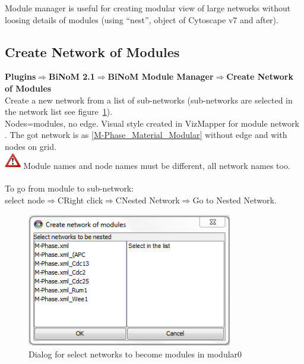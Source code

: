 Module manager is useful for creating modular view of large networks without loosing details of modules (using “nest”, object of Cytoscape v7 and after).

\subsection{Create Network of Modules}
\textbf{Plugins$\Rightarrow$BiNoM 2.1$\Rightarrow$BiNoM Module Manager$\Rightarrow$Create Network of Modules}\\
Create a new network from a list of sub-networks (sub-networks are selected in the network list see figure~\ref{Create_network_of_modules}).\\
Nodes=modules, no edge. Visual style created in VizMapper for module network . The got network is as \ref{M-Phase_Material_Modular} without edge and with nodes on grid.\\
\includegraphics[width=20pt,height=20pt]{graphics/warning} Module names and node names must be different, all network names too.\\\\
To go from module to sub-network:\\
select node$\Rightarrow$CRight click$\Rightarrow$CNested Network$\Rightarrow$Go to Nested Network.
\begin{figure}
\centering
\includegraphics[width=0.8\textwidth]{graphics/Create_network_of_modules}
\caption{Dialog for select networks to become modules in modular0}
\label{Create_network_of_modules}
\end{figure}

